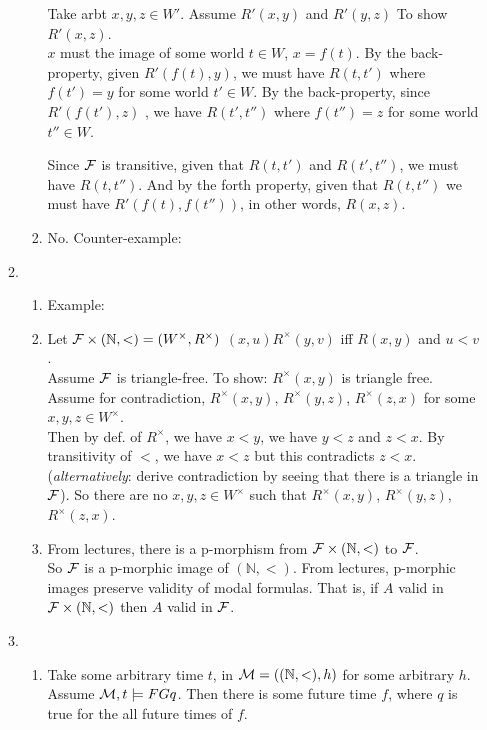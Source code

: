 \documentclass[a4paper, draft, 12pt]{article}
\begin{document}
\begin{enumerate}
\begin{enumerate}
\begin{enumerate}
  Take arbt $x, y, z \in W'$. Assume $R'(x,y)$ and $R'(y,z)$ To show $R'(x,z)$.\\
  $x$ must the image of some world $t \in W$, $x = f(t)$. By the back-property, 
  given $R'(f(t),y)$, we must have $R(t, t')$ where $f(t') = y$ for some world $t' \in W$. 
  By the back-property, since $R'(f(t'),z)$ , we have $R(t', t'')$ 
  where $f(t'') = z$ for some world $t'' \in W$. 

  Since $\mathcal{F}$ is transitive, given that $R(t,t')$ and $R(t', t'')$, we must have $R(t,t'')$. 
  And by the forth property, given that $R(t,t'')$ we must have $R'(f(t),f(t''))$, in
  other words, $R(x,z)$.
  \item %
  No. Counter-example:
  \end{enumerate}
\item %
  \begin{enumerate}
  \item %
  Example:
  \item %
  Let $\mathcal{F} \times (\mathbb{N}, <) = (W^{\times}, R^{\times})$ 
  $(x,u)R^{\times}(y,v)$ iff $R(x,y)$ and $u < v$. \\
  Assume $\mathcal{F}$ is triangle-free. To show: $R^{\times}(x,y)$ is triangle free.\\ 
  Assume for contradiction, $R^{\times}(x,y)$, $R^{\times}(y,z)$, $R^{\times}(z,x)$ for some $x,y,z \in W^{\times}$.\\
  Then by def. of $R^{\times}$, we have $x < y$, we have $y < z$ and $z < x$. By transitivity of $<$, 
  we have $x < z$ but this contradicts $z < x$. \\
  (\textit{alternatively}: derive contradiction by seeing that there is a triangle in $\mathcal{F}$).
  So there are no $x,y,z \in W^{\times}$ such that $R^{\times}(x,y)$, $R^{\times}(y,z)$, $R^{\times}(z,x)$.
  \item %
  From lectures, there is a p-morphism from $\mathcal{F} \times (\mathbb{N}, <)$ to $\mathcal{F}$. \\
  So $\mathcal{F}$ is a p-morphic image of $(\mathbb{N}, <)$. From lectures, p-morphic images 
  preserve validity of modal formulas. That is, if $A$ valid in $\mathcal{F} \times (\mathbb{N}, <)$ then $A$ valid in $\mathcal{F}$. 
  \end{enumerate}
\item %
  \begin{enumerate}
  \item %
  Take some arbitrary time $t$, in $\mathcal{M} = ((\mathbb{N}, <), h)$ for some arbitrary $h$. \\
  Assume $\mathcal{M}, t \models FGq$. Then there is some future time $f$, where $q$ is true for the all future times of $f$.


\end{enumerate}
\end{enumerate}
\end{enumerate}
\end{document}
